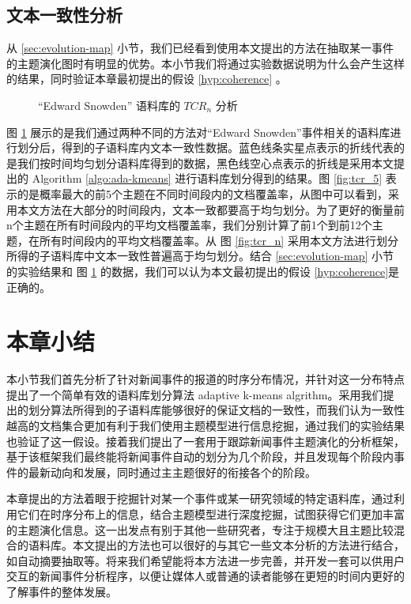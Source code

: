 \subsection{文本一致性分析}
从 \ref{sec:evolution-map} 小节，我们已经看到使用本文提出的方法在抽取某一事件的主题演化图时有明显的优势。本小节我们将通过实验数据说明为什么会产生这样的结果，同时验证本章最初提出的假设 \ref{hyp:coherence} 。
\label{sec:coherence-result}
\begin{figure}[htb]
	\centering
	\caption{“Edward Snowden” 语料库的 $TCR_n$ 分析}
	\label{fig:tcr}
\end{figure}

图 \ref{fig:tcr} 展示的是我们通过两种不同的方法对“Edward Snowden”事件相关的语料库进行划分后，得到的子语料库内文本一致性数据。蓝色线条实星点表示的折线代表的是我们按时间均匀划分语料库得到的数据，黑色线空心点表示的折线是采用本文提出的 Algorithm \ref{algo:ada-kmeans} 进行语料库划分得到的结果。图 \ref{fig:tcr_5} 表示的是概率最大的前5个主题在不同时间段内的文档覆盖率，从图中可以看到，采用本文方法在大部分的时间段内，文本一致都要高于均匀划分。为了更好的衡量前n个主题在所有时间段内的平均文档覆盖率，我们分别计算了前1个到前12个主题，在所有时间段内的平均文档覆盖率。从 图 \ref{fig:tcr_n} 采用本文方法进行划分所得的子语料库中文本一致性普遍高于均匀划分。结合 \ref{sec:evolution-map} 小节的实验结果和 图 \ref{fig:tcr} 的数据，我们可以认为本文最初提出的假设 \ref{hyp:coherence}是正确的。 

\section{本章小结}
本小节我们首先分析了针对新闻事件的报道的时序分布情况，并针对这一分布特点提出了一个简单有效的语料库划分算法 adaptive k-means algrithm。采用我们提出的划分算法所得到的子语料库能够很好的保证文档的一致性，而我们认为一致性越高的文档集合更加有利于我们使用主题模型进行信息挖掘，通过我们的实验结果也验证了这一假设。接着我们提出了一套用于跟踪新闻事件主题演化的分析框架，基于该框架我们最终能将新闻事件自动的划分为几个阶段，并且发现每个阶段内事件的最新动向和发展，同时通过主主题很好的衔接各个的阶段。

本章提出的方法着眼于挖掘针对某一个事件或某一研究领域的特定语料库，通过利用它们在时序分布上的信息，结合主题模型进行深度挖掘，试图获得它们更加丰富的主题演化信息。这一出发点有别于其他一些研究者，专注于规模大且主题比较混合的语料库。本文提出的方法也可以很好的与其它一些文本分析的方法进行结合，如自动摘要抽取等。将来我们希望能将本方法进一步完善，并开发一套可以供用户交互的新闻事件分析程序，以便让媒体人或普通的读者能够在更短的时间内更好的了解事件的整体发展。




